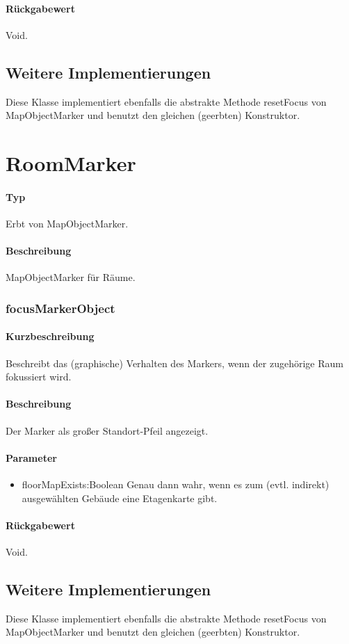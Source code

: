 \paragraph*{Rückgabewert}
Void.

\subsection{Weitere Implementierungen}
Diese Klasse implementiert ebenfalls die abstrakte Methode resetFocus von MapObjectMarker 
und benutzt den gleichen (geerbten) Konstruktor.


\section{RoomMarker}
\paragraph*{Typ} 
Erbt von MapObjectMarker.
\paragraph*{Beschreibung}
MapObjectMarker für Räume.

\subsubsection{focusMarkerObject}%
\paragraph*{Kurzbeschreibung}
Beschreibt das (graphische) Verhalten des Markers, wenn der zugehörige Raum fokussiert wird.
\paragraph*{Beschreibung}
Der Marker als großer Standort-Pfeil angezeigt.
\paragraph*{Parameter}
\begin{itemize}
    \item floorMapExists:Boolean Genau dann wahr, wenn es zum (evtl. indirekt) ausgewählten Gebäude eine Etagenkarte gibt.
\end{itemize}
\paragraph*{Rückgabewert}
Void.

\subsection{Weitere Implementierungen}
Diese Klasse implementiert ebenfalls die abstrakte Methode resetFocus von MapObjectMarker 
und benutzt den gleichen (geerbten) Konstruktor.
